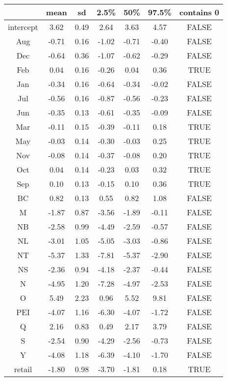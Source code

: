 \documentclass[12pt]{article}
\begin{document}
\begin{table}[hb!]
    \centering
    \begin{tabular}{|c|c|c|c|c|c|c|}
        \hline
     & \textbf{mean} & \textbf{sd} & \textbf{2.5\%} & \textbf{50\%} & \textbf{97.5\%} & \textbf{contains 0} \\ 
        \hline
    intercept & 3.62 & 0.49 & 2.64 & 3.63 & 4.57 & FALSE \\ 
      Aug & -0.71 & 0.16 & -1.02 & -0.71 & -0.40 & FALSE \\ 
      Dec & -0.64 & 0.36 & -1.07 & -0.62 & -0.29 & FALSE \\ 
      Feb & 0.04 & 0.16 & -0.26 & 0.04 & 0.36 & TRUE \\ 
      Jan & -0.34 & 0.16 & -0.64 & -0.34 & -0.02 & FALSE \\ 
      Jul & -0.56 & 0.16 & -0.87 & -0.56 & -0.23 & FALSE \\ 
      Jun & -0.35 & 0.13 & -0.61 & -0.35 & -0.09 & FALSE \\ 
      Mar & -0.11 & 0.15 & -0.39 & -0.11 & 0.18 & TRUE \\ 
      May & -0.03 & 0.14 & -0.30 & -0.03 & 0.25 & TRUE \\ 
      Nov & -0.08 & 0.14 & -0.37 & -0.08 & 0.20 & TRUE \\ 
      Oct & 0.04 & 0.14 & -0.23 & 0.03 & 0.32 & TRUE \\ 
      Sep & 0.10 & 0.13 & -0.15 & 0.10 & 0.36 & TRUE \\ 
      BC & 0.82 & 0.13 & 0.55 & 0.82 & 1.08 & FALSE \\ 
      M & -1.87 & 0.87 & -3.56 & -1.89 & -0.11 & FALSE \\ 
      NB & -2.58 & 0.99 & -4.49 & -2.59 & -0.57 & FALSE \\ 
      NL & -3.01 & 1.05 & -5.05 & -3.03 & -0.86 & FALSE \\ 
      NT & -5.37 & 1.33 & -7.81 & -5.37 & -2.90 & FALSE \\ 
      NS & -2.36 & 0.94 & -4.18 & -2.37 & -0.44 & FALSE \\ 
      N & -4.95 & 1.20 & -7.28 & -4.97 & -2.53 & FALSE \\ 
      O & 5.49 & 2.23 & 0.96 & 5.52 & 9.81 & FALSE \\ 
      PEI & -4.07 & 1.16 & -6.30 & -4.07 & -1.72 & FALSE \\ 
      Q & 2.16 & 0.83 & 0.49 & 2.17 & 3.79 & FALSE \\ 
      S & -2.54 & 0.90 & -4.29 & -2.56 & -0.73 & FALSE \\ 
      Y & -4.08 & 1.18 & -6.39 & -4.10 & -1.70 & FALSE \\ 
      retail & -1.80 & 0.98 & -3.70 & -1.81 & 0.18 & TRUE \\ 
      \hline
    \end{tabular}
\end{table}
\end{document}
